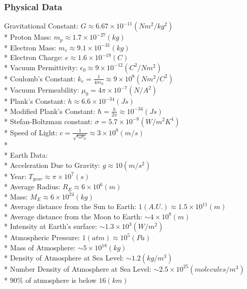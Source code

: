 \subsubsection{Physical Data}
Gravitational Constant: \(G\approx6.67\times10^{-11}(Nm^2/kg^2)\)\\*
Proton Mass:  \(m_p\approx1.7\times10^{-27}(kg)\)\\*
Electron Mass: \(m_e\approx9.1\times10^{-31}(kg)\)\\*
Electron Charge: \(e\approx1.6\times10^{-19}(C)\)\\*
Vacuum Permittivity: \(\epsilon_0\approx9\times10^{-12}(C^2/Nm^2)\)\\*
Coulomb's Constant: \(k_e=\frac{1}{4\pi\epsilon_0} \approx 9\times10^8(Nm^2/C^2)\)\\*
Vacuum Permeability: \(\mu_0=4\pi\times10^{-7}(N/A^2)\)\\*
Plank's Constant: \(h\approx6.6\times10^{-34}(Js)\)\\*
Modified Plank's Constant: \(\hbar =\frac{h}{2\pi}\approx10^{-34}(Js)\)\\*
Stefan-Boltzman constant: \(\sigma=5.7\times10^{-8}(W/m^2K^4)\)\\*
Speed of Light: \(c=\frac{1}{\sqrt{\epsilon_0\mu_0}}\approx3\times10^{8}(m/s)\)\\*
\\*
Earth Data:\\*
 Acceleration Due to Gravity: \(g \approx 10(m/s^2)\)\\*
 Year: \(T_{year}\approx\pi\times10^{7}(s)\)\\*
Average Radius: \(R_E\approx6\times10^6 (m)\)\\*
Mass: \(M_E\approx6\times10^{24}(kg)\)\\*
Average distance from the Sun to Earth: \(1(A.U.)\approx1.5\times10^{11}(m)\)\\*
Average distance from the Moon to Earth: \(\sim4\times10^{8}(m)\)\\*
Intensity at Earth's surface: \(\sim1.3\times10^3(W/m^2)\)\\*
Atmospheric Pressure: \(1(atm)\approx10^5(Pa)\)\\*
Mass of Atmosphere: \(\sim5\times10^{18}(kg)\)\\*
Density of Atmosphere at Sea Level: \(\sim1.2(kg/m^3)\)\\*
Number Density of Atmosphere at Sea Level: \(\sim2.5\times10^{25}(molecules/m^3)\)\\*
\(90\%\) of atmosphere is below \(16(km)\)

